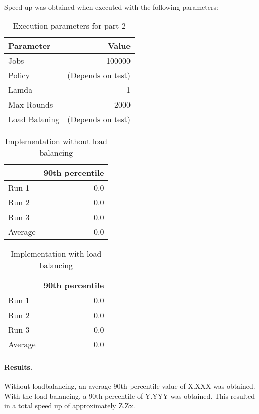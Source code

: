 \documentclass[12pt]{article}
\begin{document}
\paragraph{} Speed up was obtained when executed with the following parameters:
\begin{table}[H]
  \centering
  \begin{tabular}{lr}
    {\bf Parameter} & {\bf Value} \\
    \hline
    Jobs & 100000 \\
    Policy & (Depends on test) \\
    Lamda & 1 \\
    Max Rounds & 2000 \\
    Load Balaning & (Depends on test) \\
  \end{tabular}
  \caption{Execution parameters for part 2}
  \label{tbl-part2-params}
\end{table}

\begin{table}[H]
  \centering
  \begin{tabular}{lr}
    & {\bf 90th percentile} \\
    \hline
    Run 1 & 0.0 \\
    Run 2 & 0.0 \\
    Run 3 & 0.0 \\
    \hline
    Average & 0.0 \\
  \end{tabular}
  \caption{Implementation without load balancing}
  \label{tbl-part2-originall}
\end{table}

\begin{table}[H]
  \centering
  \begin{tabular}{lr}
    & {\bf 90th percentile} \\
    \hline
    Run 1 & 0.0 \\
    Run 2 & 0.0 \\
    Run 3 & 0.0 \\
    \hline
    Average & 0.0 \\
  \end{tabular}
  \caption{Implementation with load balancing}
  \label{tbl-part2-loadbalance}
\end{table}

\paragraph{Results.} Without loadbalancing, an average 90th percentile value of X.XXX was obtained. With the load balancing, a 90th percentile of Y.YYY was obtained. This resulted in a total speed up of approximately Z.Zx.
\end{document}
